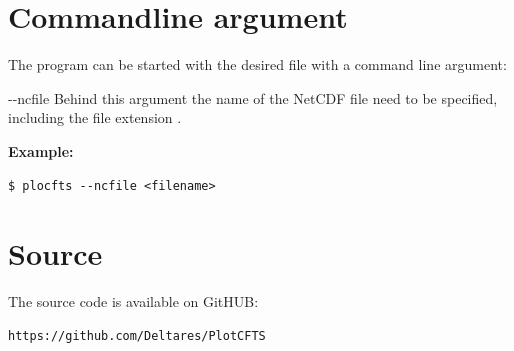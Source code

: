 \documentclass{deltares_memo}
\begin{document}
\section{Commandline argument}
The program can be started with the desired file with a command line argument:
\begin{symbollist}
    \item[{-{}-ncfile}] Behind this argument the name of the NetCDF file need to be specified, including the file extension .
\end{symbollist}
\textbf{Example:}
\begin{Verbatim}
$ plocfts --ncfile <filename>
\end{Verbatim}

\section{Source}
The source code is available on GitHUB:
\begin{Verbatim}
https://github.com/Deltares/PlotCFTS
\end{Verbatim}
\end{document}
